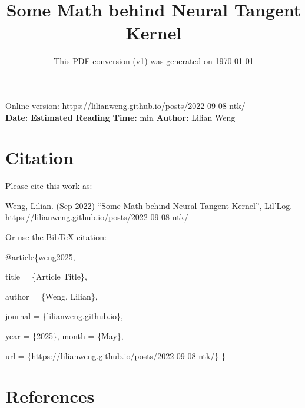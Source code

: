 \documentclass[12pt]{article}
\title{Some Math behind Neural Tangent Kernel}
\date{This PDF conversion (v1) was generated on \today\footnotemark}
\begin{document}
\maketitle
\begin{center}
    Online version: \url{https://lilianweng.github.io/posts/2022-09-08-ntk/} \\
    \textbf{Date:} \quad
    \textbf{Estimated Reading Time:}  min \quad
    \textbf{Author:} Lilian Weng
\end{center}




\newpage
\tableofcontents
\newpage
\vspace{1em}
\n\n\n\section{Citation}
Please cite this work as:

\begin{tcolorbox}[colback=black!5!white, colframe=black!80!white, boxrule=0.5pt, arc=2mm, left=1mm, right=1mm, top=1mm, bottom=1mm]
  Weng, Lilian. (Sep 2022) ``Some Math behind Neural Tangent Kernel'', Lil'Log. \url{https://lilianweng.github.io/posts/2022-09-08-ntk/}
  \end{tcolorbox}

Or use the BibTeX citation:

\begin{tcolorbox}[
    colback=black!5!white,
    colframe=black!80!white,
    boxrule=0.5pt,
    arc=2mm,
    left=1mm,
    right=1mm,
    top=1mm,
    bottom=1mm,
    listing only,
    listing options={
      basicstyle=\ttfamily\footnotesize,
      breaklines=true,
      literate={\{}{{\char`\{}}1 {\}}{{\char`\}}}1
    }
  ]
  @article\{weng2025,

    title   = \{Article Title\},

    author  = \{Weng, Lilian\},

    journal = \{lilianweng.github.io\},

    year    = \{2025\},
    month   = \{May\},

    url     = \{https://lilianweng.github.io/posts/2022-09-08-ntk/\}\n
  \}
  \end{tcolorbox}

\newpage
\section{References}

\n
\end{document}

